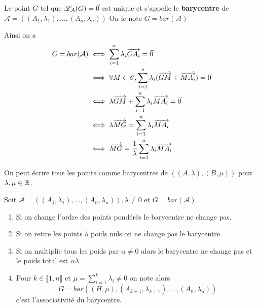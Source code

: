 \documentclass[a4paper, 12pt]{article}
\begin{document}
\begin{definition}
    Le point $G$ tel que $\mathscr{L}_\mathcal{A}(G) = \vec{0}$ est unique et s'appelle le \textbf{barycentre} de $\mathcal{A} = ((A_1, \lambda_1), \ldots, (A_n, \lambda_n))$
    On le note $G = bar(\mathcal{A})$
\end{definition}

Ainsi on a
\begin{align*}
    G = bar(\mathcal{A}) &\iff \sum_{i=1}^n \lambda_i \overrightarrow{G A_i} = \vec{0} \\
    &\iff \forall M \in \mathscr{E}, \sum_{i=1}^n \lambda_i (\overrightarrow{G M} + \overrightarrow{M A_i}) = \vec{0} \\
    &\iff \lambda \overrightarrow{G M} + \sum_{i=1}^n \lambda_i \overrightarrow{M A_i} = \vec{0} \\
    &\iff \lambda \overrightarrow{M G} = \sum_{i=1}^n \lambda_i \overrightarrow{M A_i} \\
    &\iff \overrightarrow{MG} = \frac{1}{\lambda} \sum_{i=1}^n \lambda_i \overrightarrow{MA_i}
\end{align*}

\begin{remarque}
    On peut écrire tous les points comme barycentres de $((A, \lambda), (B, \mu))$ pour $\lambda, \mu \in \mathbb{R}$.
\end{remarque}

\begin{proposition}{}{}
    Soit $\mathcal{A} = ((A_1, \lambda_1), \ldots, (A_n, \lambda_n)), \lambda \neq 0$
    et $G = bar(\mathcal{A})$
    \begin{enumerate}[label=\roman*.]
        \item Si on change l'ordre des points pondérés le barycentre ne change pas.
        \item Si on retire les points à poids nuls on ne change pas le barycentre.
        \item Si on multiplie tous les poids par $\alpha \neq 0$ alors le barycentre ne change pas et le poids total est $\alpha \lambda$.
        \item Pour $k \in \llbracket 1, n \rrbracket$ et $\mu = \sum_{i=1}^k \lambda_i \neq 0$ on note  alors
        $$
        G = bar((H, \mu), (A_{k+1}, \lambda_{k+1}), \ldots, (A_n, \lambda_n))
        $$
        c'est l'associativité du barycentre.
    \end{enumerate}
\end{proposition}
\end{document}
